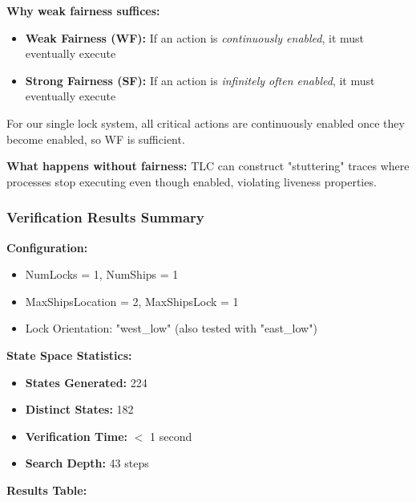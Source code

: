 \documentclass[12pt,a4paper]{article}
\begin{document}
\textbf{Why weak fairness suffices:}
\begin{itemize}
    \item \textbf{Weak Fairness (WF):} If an action is \textit{continuously enabled}, it must eventually execute
    \item \textbf{Strong Fairness (SF):} If an action is \textit{infinitely often enabled}, it must eventually execute
\end{itemize}

For our single lock system, all critical actions are continuously enabled once they become enabled, so WF is sufficient.

\textbf{What happens without fairness:}
TLC can construct "stuttering" traces where processes stop executing even though enabled, violating liveness properties.

\subsubsection{Verification Results Summary}

\textbf{Configuration:}
\begin{itemize}
    \item NumLocks = 1, NumShips = 1
    \item MaxShipsLocation = 2, MaxShipsLock = 1
    \item Lock Orientation: "west\_low" (also tested with "east\_low")
\end{itemize}

\textbf{State Space Statistics:}
\begin{itemize}
    \item \textbf{States Generated:} 224
    \item \textbf{Distinct States:} 182
    \item \textbf{Verification Time:} $<$ 1 second
    \item \textbf{Search Depth:} 43 steps
\end{itemize}

\textbf{Results Table:}
\end{document}
